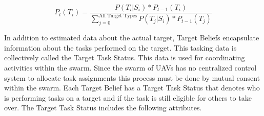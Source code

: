 \begin{multicols*}{2}





\begin{equation}
\label{eq:bayesian}
P_{t}(T_{i}) = \frac{P(T_{i}|S_{i})*P_{t-1}(T_{i})}{ \sum_{j=0}^{\text{All Target Types}}P(T_{j}|S_{i}) * P_{t-1}(T_{j}) }
\end{equation}




In addition to estimated data about the actual target, Target Beliefs encapsulate information about the tasks performed on the target.  This tasking data is collectively called the Target Task Status.  This data is used for coordinating activities within the swarm.  Since the swarm of UAVs has no centralized control system to allocate task assignments this process must be done by mutual consent within the swarm.  Each Target Belief has a Target Task Status that denotes who is performing tasks on a target and if the task is still eligible for others to take over.  The Target Task Status includes the following attributes.


\end{multicols*}
